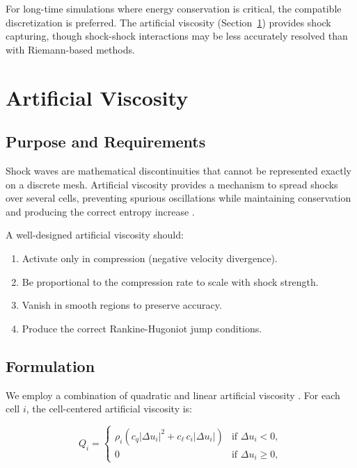 \documentclass[12pt,a4paper]{article}
\begin{document}
For long-time simulations where energy conservation is critical, the compatible discretization is preferred. The artificial viscosity (Section~\ref{sec:viscosity}) provides shock capturing, though shock-shock interactions may be less accurately resolved than with Riemann-based methods.

\section{Artificial Viscosity}
\label{sec:viscosity}

\subsection{Purpose and Requirements}

Shock waves are mathematical discontinuities that cannot be represented exactly on a discrete mesh. Artificial viscosity provides a mechanism to spread shocks over several cells, preventing spurious oscillations while maintaining conservation and producing the correct entropy increase \citep{VonNeumann1950}.

A well-designed artificial viscosity should:
\begin{enumerate}
    \item Activate only in compression (negative velocity divergence).
    \item Be proportional to the compression rate to scale with shock strength.
    \item Vanish in smooth regions to preserve accuracy.
    \item Produce the correct Rankine-Hugoniot jump conditions.
\end{enumerate}

\subsection{Formulation}

We employ a combination of quadratic and linear artificial viscosity \citep{Caramana1998AV}. For each cell $i$, the cell-centered artificial viscosity is:

\begin{equation}
    Q_i = \begin{cases}
        \rho_i \left( c_q |\Delta u_i|^2 + c_\ell \, c_i |\Delta u_i| \right) & \text{if } \Delta u_i < 0, \\
        0 & \text{if } \Delta u_i \geq 0,
    \end{cases}
    \label{eq:av}
\end{equation}
\end{document}
